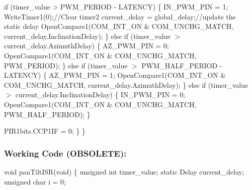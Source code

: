 \documentclass[]{article}
\begin{document}
		if (timer\_value > PWM\_PERIOD - LATENCY) \newline
		\{ \newline
			IN\_PWM\_PIN = 1;\newline
			WriteTimer1(0);\newline     //Clear timer2
			current\_delay = global\_delay;\newline   //update the static delay
			OpenCompare1(COM\_INT\_ON \& COM\_UNCHG\_MATCH, current\_delay.InclinationDelay);\newline
		\} \newline
		else if (timer\_value $>$ current\_delay.AzimuthDelay) \newline
		\{ \newline
			AZ\_PWM\_PIN = 0;\newline
			OpenCompare1(COM\_INT\_ON \& COM\_UNCHG\_MATCH, PWM\_PERIOD);\newline
		\} \newline
		else if (timer\_value $>$ PWM\_HALF\_PERIOD - LATENCY) \newline
		\{ \newline
			AZ\_PWM\_PIN = 1;\newline
			OpenCompare1(COM\_INT\_ON \& COM\_UNCHG\_MATCH, current\_delay.AzimuthDelay);\newline
		\} \newline
		else if (timer\_value $>$ current\_delay.InclinationDelay) \newline
		\{ \newline
			IN\_PWM\_PIN = 0;\newline
			OpenCompare1(COM\_INT\_ON \& COM\_UNCHG\_MATCH, PWM\_HALF\_PERIOD);\newline
		\} \newline
		
		PIR1bits.CCP1IF = 0;\newline
	\} \newline
\} \newline

\subsubsection{Working Code (OBSOLETE):}
void panTiltISR(void)\newline
\{ \newline
	unsigned int timer\_value;\newline
	static Delay current\_delay;\newline
	unsigned char i = 0;\newline
	
\end{document}
